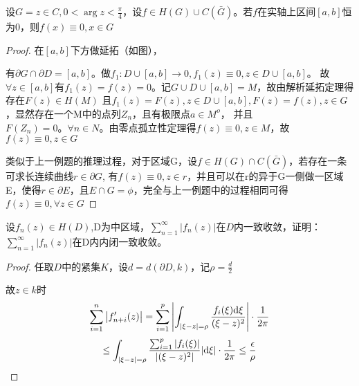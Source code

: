 \begin{eg}
	\color{blue}设$G={z\in C,0<\arg z<\frac{\pi}{4}}$，设$f\in H(G)\cup C(\bar G)$。若$f$在实轴上区间$[a,b]$恒为$0$，则$f(x)\equiv 0,x\in G$
	
	\color{black}
	\begin{proof}
	在$[a,b]$下方做延拓（如图），
	
	有$\partial G \cap \partial D=[a,b]$。做$f_{1}:D\cup [a,b] \to {0} ,f_{1}(z)\equiv 0,z\in D\cup [a,b]$。
	故$\forall z\in [a,b]$有$f_{1}(z)=f(z)=0$。记$G\cup D \cup [a,b]=M$，故由解析延拓定理得存在$F(z)\in H(M)$
	且$f_{1}(z)=F(z),z\in D\cup [a,b],F(z)=f(z),z\in G$，显然存在一个M中的点列${Z_{n}}$，且有极限点$a\in M^{o}$，
	并且$F(Z_{n})=0。\forall n\in N。$由零点孤立性定理得$f(z)\equiv 0,z\in M$，故$f(z)\equiv 0,z\in G$
	
	类似于上一例题的推理过程，对于区域G，设$f\in H(G)\cap C(\bar{G})$，若存在一条可求长连续曲线$r \in \partial G$,
	有$f(z)\equiv 0,z\in r$，并且可以在r的异于G一侧做一区域E，使得$r\in \partial E$，且$E\cap G=\phi$，完全与上一例题中的过程相同可得$f(z)\equiv 0,\forall z\in G$
	\end{proof}
\end{eg}
\begin{eg}
	\color{blue}设$f_{n}(z)\in H(D)$,D为中区域，$\sum_{n=1}^{\infty}|f_{n}(z)|$在$D$内一致收敛，证明：$\sum_{n=1}^{\infty}|f_{n}(z)|$在D内内闭一致收敛。
	
	\color{black}
	\begin{proof}
	任取$D$中的紧集$K$，设$d=d(\partial D,k)$，记$\rho=\frac{d}{2}$
	
	故$z\in k$时
	\begin{equation*}
	\sum\limits_{i=1}^{n}\left|f'_{n+i}(z)\right|=\sum\limits_{i=1}^{p}\left|\int_{|\xi -z|=\rho }\dfrac{f_{i}(\xi)\mathrm{d}\xi}{(\xi -z)^{2}}\right|\cdot \dfrac{1}{2\pi}
	\end{equation*}
	\begin{equation*}
	\le \int_{|\xi -z|=\rho }\frac{\sum_{i=1}^{p}|f_{i}(\xi)|}{|(\xi -z)^{2}|}|\mathrm{d}\xi|\cdot \dfrac{1}{2\pi}\le \dfrac{\epsilon}{\rho}
	\end{equation*}
	\end{proof}
\end{eg}
